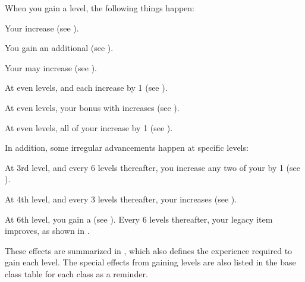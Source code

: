   When you gain a level, the following things happen:
  \begin{raggeditemize}
    \item Your  increase (see ).
    \item You gain an additional  (see ).
    \item Your  may increase (see ).
    \item At even levels,  and  each increase by 1 (see ).
    \item At even levels, your bonus with  increases (see ).
    \item At even levels, all of your  increase by 1 (see ).
  \end{raggeditemize}

  In addition, some irregular advancements happen at specific levels:
  \begin{raggeditemize}
    \item At 3rd level, and every 6 levels thereafter, you increase any two of your  by 1 (see ).
    \item At 4th level, and every 3 levels thereafter, your  increases (see ).
    \item At 6th level, you gain a  (see ).
      Every 6 levels thereafter, your legacy item improves, as shown in .
  \end{raggeditemize}

  These effects are summarized in , which also defines the experience required to gain each level.
  The special effects from gaining levels are also listed in the base class table for each class as a reminder.

